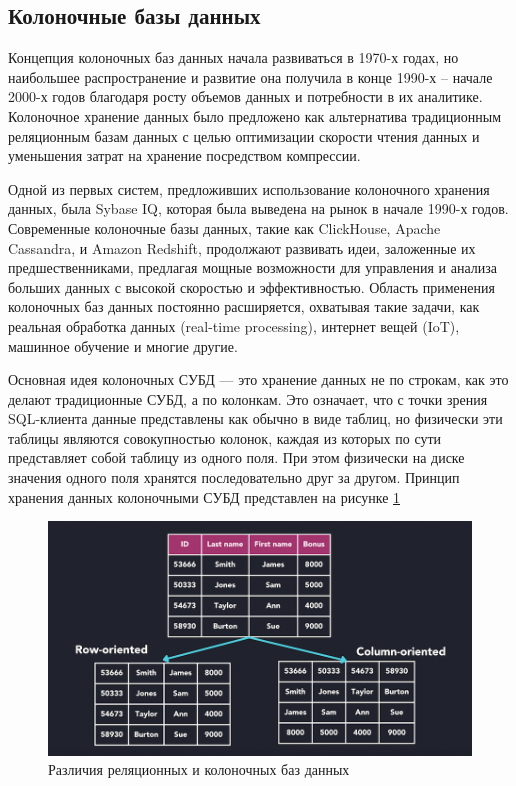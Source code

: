 \documentclass[14pt, russian]{scrartcl}
\begin{document}
\subsection{Колоночные базы данных}

Концепция колоночных баз данных начала развиваться в 1970-х годах, но наибольшее распространение и развитие она получила в конце 1990-х – начале 2000-х годов благодаря росту объемов данных и потребности в их аналитике. Колоночное хранение данных было предложено как альтернатива традиционным реляционным базам данных с целью оптимизации скорости чтения данных и уменьшения затрат на хранение посредством компрессии.

Одной из первых систем, предложивших использование колоночного хранения данных, была Sybase IQ, которая была выведена на рынок в начале 1990-х годов.
Современные колоночные базы данных, такие как ClickHouse, Apache Cassandra, и Amazon Redshift, продолжают развивать идеи, заложенные их предшественниками, предлагая мощные возможности для управления и анализа больших данных с высокой скоростью и эффективностью. Область применения колоночных баз данных постоянно расширяется, охватывая такие задачи, как реальная обработка данных (real-time processing), интернет вещей (IoT), машинное обучение и многие другие.

Основная идея колоночных СУБД — это хранение данных не по строкам, как это делают традиционные СУБД, а по колонкам. Это означает, что с точки зрения SQL-клиента данные представлены как обычно в виде таблиц, но физически эти таблицы являются совокупностью колонок, каждая из которых по сути представляет собой таблицу из одного поля. При этом физически на диске значения одного поля хранятся последовательно друг за другом. Принцип хранения данных колоночными СУБД представлен на рисунке \ref{fig:columnarvsrelational}

\begin{figure}[H]
	\centering
	\begin{minipage}[t]{.9\textwidth}
		\centering
		\includegraphics[width=.7\textwidth]{./imgs/columnar-database.png}
	\end{minipage}
	\caption{Различия реляционных и колоночных баз данных}
	\label{fig:columnarvsrelational}
\end{figure}
\end{document}
